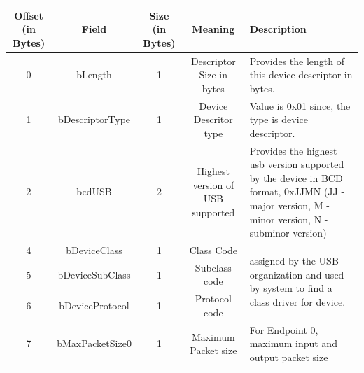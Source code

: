 \documentclass{article}
\begin{document}
\begin{table}[H]
    \centering
    \begin{adjustbox}{max width=\textwidth}
        \begin{tabular}{|c|c|c|c|p{6cm}|}
            \hline
            \textbf{Offset (in Bytes)} & \textbf{Field}     & \textbf{Size (in Bytes)} & \textbf{Meaning}                   & \textbf{Description}                                                                                                                         \\
            \hline
            0                          & bLength            & 1                        & Descriptor Size in bytes           & Provides the length of this device descriptor in bytes.                                                                                      \\
            \hline
            1                          & bDescriptorType    & 1                        & Device Descritor type              & Value is 0x01 since, the type is device descriptor.                                                                                          \\
            \hline
            2                          & bcdUSB             & 2                        & Highest version of USB supported   & Provides the highest usb version supported by the device in BCD format, 0xJJMN (JJ - major version, M - minor version, N - subminor version) \\
            \hline
            4                          & bDeviceClass       & 1                        & Class Code                         & \multirow{3}{6cm}{assigned by the USB organization and used by system to find a class driver for device.}                                    \\
            \cline{1-4}
            5                          & bDeviceSubClass    & 1                        & Subclass code                      &                                                                                                                                              \\
            \cline{1-4}
            6                          & bDeviceProtocol    & 1                        & Protocol code                      &                                                                                                                                              \\
            \hline
            7                          & bMaxPacketSize0    & 1                        & Maximum Packet size                & For Endpoint 0, maximum input and output packet size                                                                                         \\

\end{tabular}
\end{adjustbox}
\end{table}
\end{document}
